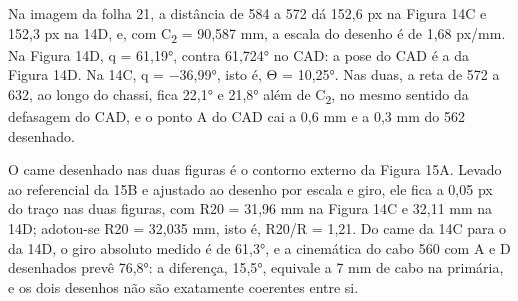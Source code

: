 Na imagem da folha 21, a distância de 584 a 572 dá 152,6 px na Figura 14C e 152,3 px na 14D, e, com C\textsubscript{2} = 90,587 mm, a escala do desenho é de 1,68 px/mm. Na Figura 14D, q = 61,19°, contra 61,724° no CAD: a pose do CAD é a da Figura 14D. Na 14C, q = −36,99°, isto é, Θ = 10,25°. Nas duas, a reta de 572 a 632, ao longo do chassi, fica 22,1° e 21,8° além de C\textsubscript{2}, no mesmo sentido da defasagem do CAD, e o ponto A do CAD cai a 0,6 mm e a 0,3 mm do 562 desenhado.

O came desenhado nas duas figuras é o contorno externo da Figura 15A. Levado ao referencial da 15B e ajustado ao desenho por escala e giro, ele fica a 0,05 px do traço nas duas figuras, com R20 = 31,96 mm na Figura 14C e 32,11 mm na 14D; adotou-se R20 = 32,035 mm, isto é, R20/R = 1,21. Do came da 14C para o da 14D, o giro absoluto medido é de 61,3°, e a cinemática do cabo 560 com A e D desenhados prevê 76,8°: a diferença, 15,5°, equivale a 7 mm de cabo na primária, e os dois desenhos não são exatamente coerentes entre si.

